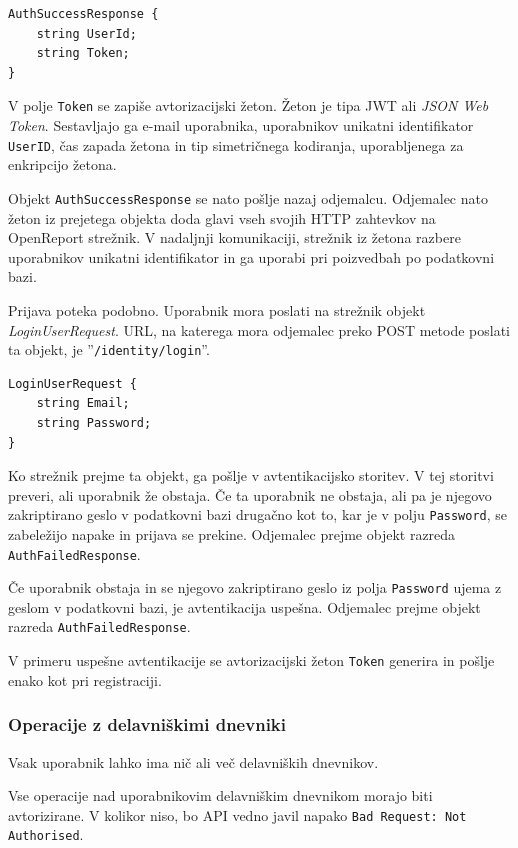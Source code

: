 \documentclass[a4paper, 12pt]{book}
\begin{document}
\begin{verbatim}
AuthSuccessResponse { 
    string UserId; 
    string Token; 
} 
\end{verbatim}

\noindent V polje \texttt{Token} se zapiše avtorizacijski žeton.
Žeton je tipa JWT ali \textit{JSON Web Token}.
Sestavljajo ga e-mail uporabnika, uporabnikov unikatni identifikator \texttt{UserID}, čas zapada žetona in tip simetričnega kodiranja, uporabljenega za enkripcijo žetona.

Objekt \texttt{AuthSuccessResponse} se nato pošlje nazaj odjemalcu.
Odjemalec nato žeton iz prejetega objekta doda glavi vseh svojih HTTP zahtevkov na OpenReport strežnik.
V nadaljnji komunikaciji, strežnik iz žetona razbere uporabnikov unikatni identifikator in ga uporabi pri poizvedbah po podatkovni bazi.

Prijava poteka podobno.
Uporabnik mora poslati na strežnik objekt \textit{LoginUserRequest}.
URL, na katerega mora odjemalec preko POST metode poslati ta objekt, je ''\texttt{/identity/login}''.

\begin{verbatim}
LoginUserRequest {
    string Email; 
    string Password; 
} 
\end{verbatim}

Ko strežnik prejme ta objekt, ga pošlje v avtentikacijsko storitev.
V tej storitvi preveri, ali uporabnik že obstaja.
Če ta uporabnik ne obstaja, ali pa je njegovo zakriptirano geslo v podatkovni bazi drugačno kot to, kar je v polju \texttt{Password}, se zabeležijo napake in prijava se prekine.
Odjemalec prejme objekt razreda \texttt{AuthFailedResponse}.

Če uporabnik obstaja in se njegovo zakriptirano geslo iz polja \texttt{Password} ujema z geslom v podatkovni bazi, je avtentikacija uspešna.
Odjemalec prejme objekt razreda \texttt{AuthFailedResponse}.

V primeru uspešne avtentikacije se avtorizacijski žeton \texttt{Token} generira in pošlje enako kot pri registraciji.

\subsubsection{Operacije z delavniškimi dnevniki}

Vsak uporabnik lahko ima nič ali več delavniških dnevnikov.

Vse operacije nad uporabnikovim delavniškim dnevnikom morajo biti avtorizirane.
V kolikor niso, bo API vedno javil napako \texttt{Bad Request: Not Authorised}.
\end{document}
